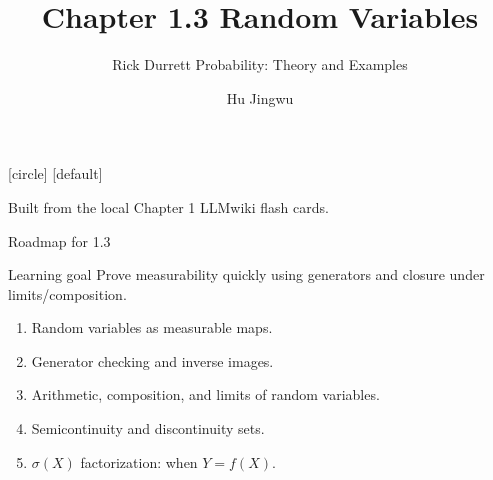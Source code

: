 [circle]
[default]

\usepackage{amsmath,amssymb,mathtools}

\newcommand{\OmegaSpace}{\Omega}
\newcommand{\F}{\mathcal{F}}
\newcommand{\A}{\mathcal{A}}
\newcommand{\B}{\mathcal{B}}
\newcommand{\Sfield}{\mathcal{S}}
\newcommand{\G}{\mathcal{G}}
\newcommand{\Hclass}{\mathcal{H}}
\newcommand{\R}{\mathbb{R}}
\newcommand{\Z}{\mathbb{Z}}
\newcommand{\Q}{\mathbb{Q}}
\newcommand{\Prob}{\mathbb{P}}
\newcommand{\one}{\mathbf{1}}
\newcommand{\vikiname}[1]{\par\smallskip{\scriptsize\color{blue!60!black}\textbf{LLMwiki:} \texttt{\detokenize{#1}}}}
\newcommand{\blankproof}{%
  \vspace{2mm}
  {\color{gray!55}\rule{\linewidth}{0.4pt}}\par\vspace{5mm}
  {\color{gray!55}\rule{\linewidth}{0.4pt}}\par\vspace{5mm}
  {\color{gray!55}\rule{\linewidth}{0.4pt}}\par\vspace{5mm}
  {\color{gray!55}\rule{\linewidth}{0.4pt}}\par
}
\newcommand{\proofblock}[1]{\ifteacher #1 \else \blankproof \fi}

\title[Chapter 1.3]{Chapter 1.3 Random Variables}
\subtitle{Rick Durrett Probability: Theory and Examples}
\author{Hu Jingwu}
\date{}



\begin{frame}
  \titlepage
  \vspace{-5mm}
  \begin{center}
    \small Built from the local Chapter 1 LLMwiki flash cards.
  \end{center}
\end{frame}

\begin{frame}{Roadmap for 1.3}
  \begin{block}{Learning goal}
    Prove measurability quickly using generators and closure under limits/composition.
  \end{block}
  \begin{enumerate}
    \item Random variables as measurable maps.
    \item Generator checking and inverse images.
    \item Arithmetic, composition, and limits of random variables.
    \item Semicontinuity and discontinuity sets.
    \item $\sigma(X)$ factorization: when $Y=f(X)$.
  \end{enumerate}
\end{frame}

